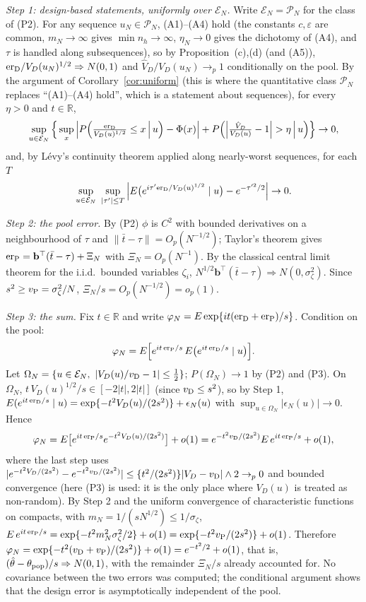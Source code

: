 \emph{Step 1: design-based statements, uniformly over $\mathcal E_N$.} Write $\mathcal E_N=\mathcal P_N$ for the class of (P2). For any sequence $u_N\in\mathcal P_N$, (A1)--(A4) hold (the constants $c,\varepsilon$ are common, $m_N\to\infty$ gives $\min n_h\to\infty$, $\eta_N\to0$ gives the dichotomy of (A4), and $\tau$ is handled along subsequences), so by Proposition~(c),(d) (and (A5)), $\mathrm{er}_{\rm D}/V_D(u_N)^{1/2}\Rightarrow N(0,1)$ and $\hat V_D/V_D(u_N)\to_p1$ conditionally on the pool. By the argument of Corollary~\ref{cor:uniform} (this is where the quantitative class $\mathcal P_N$ replaces ``(A1)--(A4) hold'', which is a statement about sequences), for every $\eta>0$ and $t\in\mathbb R$,
\[
\sup_{u\in\mathcal E_N}\Big\{\sup_x\Big|P\Big(\tfrac{\mathrm{er}_{\rm D}}{V_D(u)^{1/2}}\le x\,\Big|\,u\Big)-\Phi(x)\Big|+P\Big(\Big|\tfrac{\hat V_D}{V_D(u)}-1\Big|>\eta\,\Big|\,u\Big)\Big\}\to0,
\]
and, by L\'evy's continuity theorem applied along nearly-worst sequences, for each $T$
\[
\sup_{u\in\mathcal E_N}\ \sup_{|\tau'|\le T}\Big|E\big(e^{i\tau'\mathrm{er}_{\rm D}/V_D(u)^{1/2}}\mid u\big)-e^{-\tau'^2/2}\Big|\to0.
\]

\emph{Step 2: the pool error.} By (P2) $\phi$ is $C^2$ with bounded derivatives on a neighbourhood of $\tau$ and $\|\bar t-\tau\|=O_p(N^{-1/2})$; Taylor's theorem gives $\mathrm{er}_{\rm P}=\mathbf b^\top(\bar t-\tau)+\Xi_N$ with $\Xi_N=O_p(N^{-1})$. By the classical central limit theorem for the i.i.d.\ bounded variables $\zeta_i$, $N^{1/2}\mathbf b^\top(\bar t-\tau)\Rightarrow N(0,\sigma^2_\zeta)$. Since $s^2\ge v_{\rm P}=\sigma_\zeta^2/N$, $\Xi_N/s=O_p(N^{-1/2})=o_p(1)$.

\emph{Step 3: the sum.} Fix $t\in\mathbb R$ and write $\varphi_N=E\exp\{it(\mathrm{er}_{\rm D}+\mathrm{er}_{\rm P})/s\}$. Condition on the pool:
\[
\varphi_N=E\Big[e^{it\,\mathrm{er}_{\rm P}/s}\,E\big(e^{it\,\mathrm{er}_{\rm D}/s}\mid u\big)\Big].
\]
Let $\Omega_N=\{u\in\mathcal E_N,\ |V_D(u)/v_{\rm D}-1|\le\tfrac12\}$; $P(\Omega_N)\to1$ by (P2) and (P3). On $\Omega_N$, $t\,V_D(u)^{1/2}/s\in[-2|t|,2|t|]$ (since $v_{\rm D}\le s^2$), so by Step 1, $E(e^{it\,\mathrm{er}_{\rm D}/s}\mid u)=\exp\{-t^2V_D(u)/(2s^2)\}+\epsilon_N(u)$ with $\sup_{u\in\Omega_N}|\epsilon_N(u)|\to0$. Hence
\[
\varphi_N=E\big[e^{it\,\mathrm{er}_{\rm P}/s}e^{-t^2V_D(u)/(2s^2)}\big]+o(1)=e^{-t^2v_{\rm D}/(2s^2)}E\,e^{it\,\mathrm{er}_{\rm P}/s}+o(1),
\]
where the last step uses $|e^{-t^2V_D/(2s^2)}-e^{-t^2v_{\rm D}/(2s^2)}|\le\{t^2/(2s^2)\}|V_D-v_{\rm D}|\wedge2\to_p0$ and bounded convergence (here (P3) is used: it is the only place where $V_D(u)$ is treated as non-random). By Step 2 and the uniform convergence of characteristic functions on compacts, with $m_N=1/(sN^{1/2})\le1/\sigma_\zeta$, $E\,e^{it\,\mathrm{er}_{\rm P}/s}=\exp\{-t^2m_N^2\sigma_\zeta^2/2\}+o(1)=\exp\{-t^2v_{\rm P}/(2s^2)\}+o(1)$. Therefore $\varphi_N=\exp\{-t^2(v_{\rm D}+v_{\rm P})/(2s^2)\}+o(1)=e^{-t^2/2}+o(1)$, that is, $(\hat\theta-\theta_{\rm pop})/s\Rightarrow N(0,1)$, with the remainder $\Xi_N/s$ already accounted for. No covariance between the two errors was computed; the conditional argument shows that the design error is asymptotically independent of the pool.


